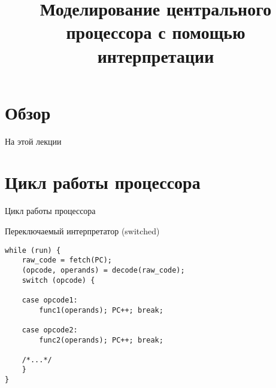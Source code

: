 

\newif\ifilab
\ilabtrue

\title{Моделирование центрального процессора с помощью интерпретации}



\begin{frame}
\titlepage
\end{frame}

\section*{Обзор}

\ifilab\else
\begin{frame}{На прошлой лекции}
\end{frame}
\fi

\begin{frame}{На этой лекции}
\tableofcontents
\end{frame} 


\section{Цикл работы процессора}

\begin{frame}{Цикл работы процессора}
\centering
{}
\end{frame}

\begin{frame}[fragile]{Переключаемый интерпретатор (switched)}
\begin{lstlisting}
while (run) {
    raw_code = fetch(PC);
    (opcode, operands) = decode(raw_code);
    switch (opcode) {

    case opcode1:
        func1(operands); PC++; break;

    case opcode2:
        func2(operands); PC++; break;

    /*...*/
    }
}
\end{lstlisting}
\end{frame}

\ifilab\else
\begin{frame}{Уточненный цикл работы}
\centering
\resizebox{9cm}{7cm}{
\inputpicture{interp-cycle-expanded-exception}
}
\end{frame}
\fi

